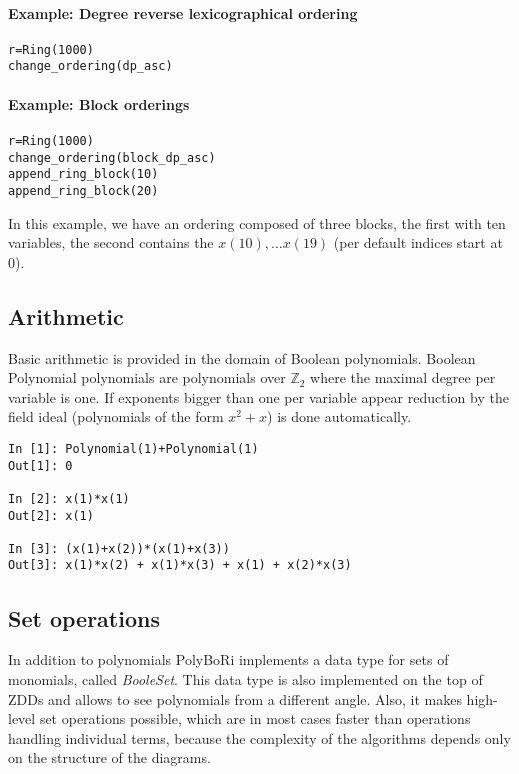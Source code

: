 \documentclass[]{article}
\newcommand{\PolyBoRi}{{\sc PolyBoRi}\xspace}
\newcommand{\functionname}[1]{\textit{#1}\xspace}
\newcommand{\Ztwo}{\mathbb{Z}_2}
\begin{document}
\paragraph{Example: Degree reverse lexicographical ordering}
\begin{verbatim}
r=Ring(1000)
change_ordering(dp_asc)
\end{verbatim}

\paragraph{Example: Block orderings}
\begin{verbatim}
r=Ring(1000)
change_ordering(block_dp_asc)
append_ring_block(10)
append_ring_block(20)
\end{verbatim}
In this example, we have an ordering composed of three blocks, the first with ten variables, the second contains the $x(10), \ldots x(19)$ (per default indices start at 0).
\subsection{Arithmetic}
Basic arithmetic is provided in the domain of Boolean polynomials. Boolean Polynomial polynomials are polynomials over $\Ztwo$ where the maximal degree per variable is one.
If exponents bigger than one per variable appear reduction by the field ideal (polynomials of the form $x^2+x$) is done automatically.
\begin{verbatim}
In [1]: Polynomial(1)+Polynomial(1)
Out[1]: 0

In [2]: x(1)*x(1)
Out[2]: x(1)

In [3]: (x(1)+x(2))*(x(1)+x(3))
Out[3]: x(1)*x(2) + x(1)*x(3) + x(1) + x(2)*x(3)
\end{verbatim}

\subsection{Set operations}
In addition to polynomials  \PolyBoRi implements a data type for sets of monomials, called \functionname{BooleSet}.
This data type is also implemented on the top of ZDDs and allows to see
polynomials
from a different angle. Also, it makes high-level set operations possible, which are in most cases faster than operations handling individual terms, because the complexity of the algorithms depends only on the structure of the diagrams.
\end{document}
